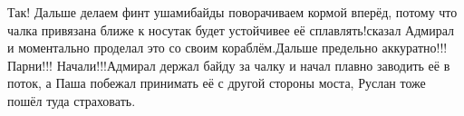 \diagdash Так! Дальше делаем финт ушами\mdash байды поворачиваем кормой вперёд, потому что чалка привязана ближе к носу\mdash так будет устойчивее её сплавлять!\mdash сказал Адмирал и моментально проделал это со своим кораблём.\mdash Дальше предельно аккуратно!!! Парни!!! Начали!!!\mdash Адмирал держал байду за чалку и начал плавно заводить её в поток, а Паша побежал принимать её с другой стороны моста, Руслан тоже пошёл туда страховать.

 





\begin{center}
\end{center}
